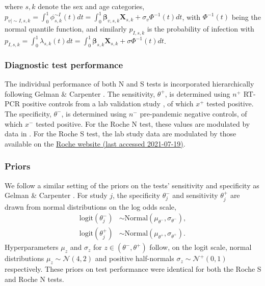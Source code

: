 \documentclass{article}
\begin{document}
where $s, k$ denote the sex and age categories, $p_{v|\sim I, s, k}= \int_0^1 \phi_{s,k}^{\sim I}(t) dt = \int_0^1 \boldsymbol{\beta}_{v, s, k}\boldsymbol{X}_{s, k} + \sigma_{v} \Phi^{-1}(t) dt$, with $\Phi^{-1}(t)$ being the normal quantile function, and similarly $p_{I,s,k}$ is the probability of infection with $p_{I,s,k} = \int_0^1\lambda_{s, k}(t)dt = \int_0^1\boldsymbol{\beta}_{s, k} \boldsymbol{X}_{s, k}+ \sigma \Phi^{-1}(t)dt$.

\hypertarget{diagnostic-test-performance}{%
\subsubsection*{Diagnostic test
performance}\label{diagnostic-test-performance}}

The individual performance of both N and S tests is incorporated
hierarchically following Gelman \& Carpenter \cite{gelman2020}.
The sensitivity, $\theta^+$, is determined using $n^+$ RT-PCR
positive controls from a lab validation study \cite{muench2020}, of which
$x^+$ tested positive. The specificity, $\theta^-$, is determined
using $n^-$ pre-pandemic negative controls, of which $x^-$ tested
positive. For the Roche N test, these values are modulated by data in \cite{ainsworth2020performance}.
For the Roche S test, the lab study data are modulated by those
available on the
\href{https://diagnostics.roche.com/global/en/products/params/elecsys-anti-sars-cov-2-s.html}{Roche website (last accessed 2021-07-19)}.

\hypertarget{priors}{%
\subsubsection*{Priors}\label{priors}}

We follow a similar setting of the priors on the tests' sensitivity and
specificity as Gelman \& Carpenter \cite{gelman2020}.
For study $j$, the specificity $\theta^-_j$ and sensitivity
$\theta^+_j$ are drawn from normal distributions on the log odds
scale, \[
\begin{aligned}
\text{logit}(\theta^-_j) &\sim \text{Normal}(\mu_{\theta^-}, \sigma_{\theta^-}),\\
\text{logit}(\theta^+_j) &\sim \text{Normal}(\mu_{\theta^+}, \sigma_{\theta^+}).
\end{aligned}
\] Hyperparameters $\mu_z$ and $\sigma_z$ for
$z \in (\theta^-, \theta^+)$ follow, on the logit scale, normal
distributions $\mu_z \sim \mathcal N(4,2)$ and positive half-normals
$\sigma_z \sim \mathcal N^+(0,1)$ respectively. These priors on test
performance were identical for both the Roche S and Roche N tests.
\end{document}
